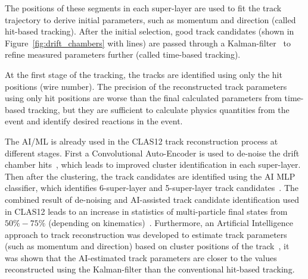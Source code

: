 \documentclass[preprint,12pt]{elsarticle}
\begin{document}
The positions of these segments in each super-layer are used to fit the track trajectory 
to derive initial parameters, such as momentum and direction (called hit-based tracking).  After the initial selection, good track candidates 
(shown in Figure~\ref{fig:drift_chambers} with lines) are passed through a Kalman-filter~\cite{Kalman1960} to 
refine measured parameters further (called time-based tracking).

At the first stage of the tracking, the tracks are identified using only the hit positions (wire number). The precision 
of the reconstructed track parameters using only hit positions are worse than the final calculated parameters from time-based tracking, but they are sufficient to calculate physics quantities from the event and identify desired reactions in the event. 


The AI/ML is already used in the CLAS12 track reconstruction process at different stages. First a Convolutional
Auto-Encoder is used to de-noise the drift chamber hits~\cite{Thomadakis:2022zcd}, which leads to improved cluster
identification in each super-layer. Then after the clustering, the track candidates are identified using the AI MLP classifier,
which identifies 6-super-layer and 5-super-layer track candidates~\cite{Gavalian:2020oxg}. The combined result of
de-noising and AI-assisted track candidate identification used in CLAS12 leads to an increase in statistics of multi-particle 
final states from $50\%-75\%$ (depending on kinematics)~\cite{Gavalian:2020xmc}. 
Furthermore, an Artificial Intelligence approach to track reconstruction was developed to estimate track parameters 
(such as momentum and direction) based on cluster positions of the track~\cite{Thomadakis:2023ebe}, it was shown that 
the AI-estimated track parameters are closer to the values reconstructed using the Kalman-filter than the 
conventional hit-based tracking.
\end{document}
